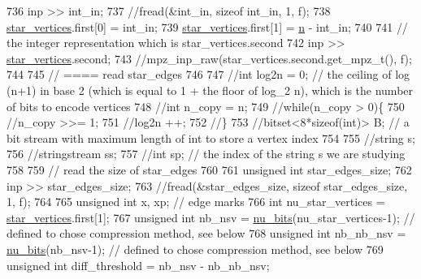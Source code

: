 \begin{DoxyCode}
736   inp >> int\_in;
737   \textcolor{comment}{//fread(&int\_in, sizeof int\_in, 1, f);}
738   \hyperlink{classmarked__graph__compressed_a7a4ced4586e2e353f9076bd447df5208}{star\_vertices}.first[0] = int\_in;
739   \hyperlink{classmarked__graph__compressed_a7a4ced4586e2e353f9076bd447df5208}{star\_vertices}.first[1] = \hyperlink{classmarked__graph__compressed_a8d841016ddb11cfd33748c8deb6277ba}{n} - int\_in;
740 
741   \textcolor{comment}{// the integer representation which is star\_vertices.second}
742   inp >> \hyperlink{classmarked__graph__compressed_a7a4ced4586e2e353f9076bd447df5208}{star\_vertices}.second;
743   \textcolor{comment}{//mpz\_inp\_raw(star\_vertices.second.get\_mpz\_t(), f);}
744 
745   \textcolor{comment}{// ==== read star\_edges}
746 
747   \textcolor{comment}{//int log2n = 0; // the ceiling of log (n+1) in base 2 (which is equal to 1 + the floor of log\_2 n),
       which is the number of bits to encode vertices}
748   \textcolor{comment}{//int n\_copy = n;}
749   \textcolor{comment}{//while(n\_copy > 0)\{}
750   \textcolor{comment}{//n\_copy >>= 1;}
751   \textcolor{comment}{//log2n ++;}
752   \textcolor{comment}{//\}}
753   \textcolor{comment}{//bitset<8*sizeof(int)> B; // a bit stream with maximum length of int to store a vertex index}
754 
755   \textcolor{comment}{//string s;}
756   \textcolor{comment}{//stringstream ss;}
757   \textcolor{comment}{//int sp; // the index of the string s we are studying }
758 
759   \textcolor{comment}{// read the size of star\_edges}
760 
761   \textcolor{keywordtype}{unsigned} \textcolor{keywordtype}{int} star\_edges\_size;
762   inp >> star\_edges\_size;
763   \textcolor{comment}{//fread(&star\_edges\_size, sizeof star\_edges\_size, 1, f);}
764 
765   \textcolor{keywordtype}{unsigned} \textcolor{keywordtype}{int} x, xp; \textcolor{comment}{// edge marks}
766   \textcolor{keywordtype}{int} nu\_star\_vertices = \hyperlink{classmarked__graph__compressed_a7a4ced4586e2e353f9076bd447df5208}{star\_vertices}.first[1];
767   \textcolor{keywordtype}{unsigned} \textcolor{keywordtype}{int} nb\_nsv = \hyperlink{bitstream_8cpp_a9dfce6f51e3febb3973aa3b16c2fecb4}{nu\_bits}(nu\_star\_vertices-1); \textcolor{comment}{// defined to chose compression method, see
       below}
768   \textcolor{keywordtype}{unsigned} \textcolor{keywordtype}{int} nb\_nb\_nsv = \hyperlink{bitstream_8cpp_a9dfce6f51e3febb3973aa3b16c2fecb4}{nu\_bits}(nb\_nsv-1); \textcolor{comment}{// defined to chose compression method, see below}
769   \textcolor{keywordtype}{unsigned} \textcolor{keywordtype}{int} diff\_threshold = nb\_nsv - nb\_nb\_nsv;

\end{DoxyCode}

